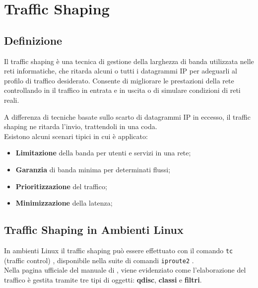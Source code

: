 \chapter{Traffic Shaping}
\label{cap:tc}
\section{Definizione}
\begin{defn}
  Il traffic shaping è una tecnica di gestione della larghezza di banda utilizzata nelle reti informatiche,
  che ritarda alcuni o tutti i datagrammi IP per adeguarli al profilo di traffico desiderato.
  Consente di migliorare le prestazioni della rete controllando in il traffico in entrata e in uscita o di simulare condizioni di reti reali.
\end{defn}
A differenza di tecniche basate sullo scarto di datagrammi IP in eccesso, il traffic shaping ne ritarda l'invio, trattendoli in una coda. \\
Esistono alcuni scenari tipici in cui è applicato:
\begin{itemize}
  \item \textbf{Limitazione} della banda per utenti e servizi in una rete;
  \item \textbf{Garanzia} di banda minima per determinati flussi;
  \item \textbf{Prioritizzazione} del traffico;
  \item \textbf{Minimizzazione} della latenza;
\end{itemize}

\section{Traffic Shaping in Ambienti Linux}
In ambienti Linux il traffic shaping può essere effettuato con il comando \texttt{tc} (traffic control) \cite{tc}, disponibile nella suite di comandi \texttt{iproute2} \cite{iproute2}.\\
Nella pagina ufficiale del manuale di \cite{tc}, viene evidenziato come l'elaborazione del traffico è gestita tramite tre tipi di oggetti: \textbf{qdisc}, \textbf{classi} e \textbf{filtri}.


